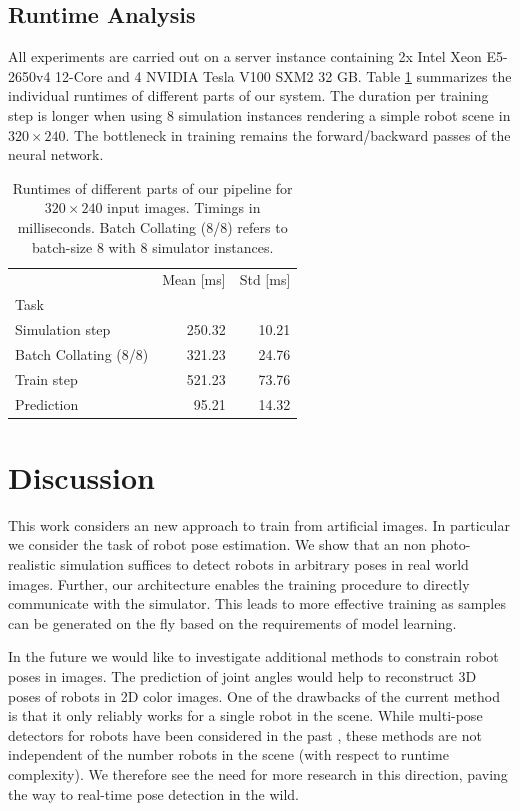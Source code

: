 \documentclass[conference]{IEEEtran}
\begin{document}
    \subsection{Runtime Analysis}
    All experiments are carried out on a server instance containing 2x Intel Xeon E5-2650v4 12-Core and 4 NVIDIA Tesla V100 SXM2 32 GB. Table \ref{tab:runtime} summarizes the individual runtimes of different parts of our system. The duration per training step is longer when using 8 simulation instances rendering a simple robot scene in $320 \times 240$. The bottleneck in training remains the forward/backward passes of the neural network.

    \begin{table}
        \centering
        \begin{tabular}{lrr}
            \toprule
            {} &  Mean [ms] &  Std [ms] \\
            Task                   &            &           \\
            \midrule
            Simulation step        &      250.32 &    10.21  \\
            Batch Collating (8/8)  &      321.23 &    24.76  \\
            Train step             &      521.23 &   73.76  \\
            Prediction             &      95.21 &    14.32 \\
            \bottomrule
        \end{tabular}
        \caption{
            \label{tab:runtime} 
            Runtimes of different parts of our pipeline for $320 \times 240$ input images. Timings in milliseconds. Batch Collating (8/8) refers to batch-size 8 with 8 simulator instances.
        }
    \end{table}

\section{Discussion}
This work considers an new approach to train from artificial images. In particular we consider the task of robot pose estimation. We show that an non photo-realistic simulation suffices to detect robots in arbitrary poses in real world images. Further, our architecture enables the training procedure to directly communicate with the simulator. This leads to more effective training as samples can be generated on the fly based on the requirements of model learning.

In the future we would like to investigate additional methods to constrain robot poses in images. The prediction of joint angles would help to reconstruct 3D poses of robots in 2D color images. One of the drawbacks of the current method is that it only reliably works for a single robot in the scene. While multi-pose detectors for robots have been considered in the past \cite{cheind2019disp}, these methods are not independent of the number robots in the scene (with respect to runtime complexity). We therefore see the need for more research in this direction, paving the way to real-time pose detection in the wild.
\end{document}
